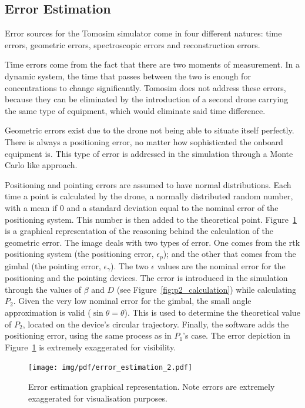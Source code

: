 \subsection{Error Estimation}%
\label{sub:error_estimation}

Error sources for the Tomosim simulator come in four different natures:
time errors, geometric errors, spectroscopic errors and reconstruction
errors.

Time errors come from the fact that there are two moments of
measurement. In a dynamic system, the time that passes between the two
is enough for concentrations to change significantly. Tomosim does not
address these errors, because they can be eliminated by the introduction
of a second drone carrying the same type of equipment, which would
eliminate said time difference.

Geometric errors exist due to the drone not being able to situate
itself perfectly. There is always a positioning error, no matter how
sophisticated the onboard equipment is. This type of error is addressed
in the simulation through a Monte Carlo like approach.

Positioning and pointing errors are assumed to have normal
distributions. Each time a point is calculated by the drone, a normally
distributed random number, with a mean if 0 and a standard deviation
equal to the nominal error of the positioning system. This number is
then added to the theoretical point.
Figure~\ref{fig:geometric_error_calculation} is a graphical
representation of the reasoning behind the calculation of the geometric
error. The image deals with two types of error. One comes from the
\gls{rtk} positioning system (the positioning error, $\epsilon_p$); and
the other that comes from the gimbal (the pointing error,
$\epsilon_\gamma$). The two $\epsilon$ values are the nominal error for
the positioning and the pointing devices. The error is introduced in the
simulation through the values of $\beta$ and $D$ (see
Figure~\ref{fig:p2_calculation}) while calculating $P_2$. Given the very
low nominal error for the gimbal, the small angle approximation is valid
($\sin \theta = \theta$). This is used to determine the theoretical
value of $P_2$, located on the device's circular trajectory. Finally,
the software adds the positioning error, using the same process as in
$P_1$'s case. The error depiction in
Figure~\ref{fig:geometric_error_calculation} is extremely exaggerated
for visibility.

\begin{figure}[htpb]
    \centering
    \texttt{[image: img/pdf/error\_estimation\_2.pdf]}
    \caption{Error estimation graphical representation. Note errors are
    extremely exaggerated for visualisation purposes.}
    \label{fig:geometric_error_calculation}
\end{figure}

